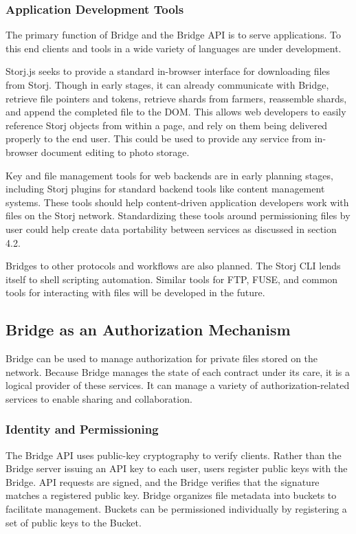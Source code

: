 \documentclass[a4paper,10pt]{article}
\begin{document}
\subsubsection{Application Development Tools}
The primary function of Bridge and the Bridge API is to serve applications. To this end clients and tools in a wide variety of languages are under development.

Storj.js seeks to provide a standard in-browser interface for downloading files from Storj. Though in early stages, it can already communicate with Bridge, retrieve file pointers and tokens, retrieve shards from farmers, reassemble shards, and append the completed file to the DOM. This allows web developers to easily reference Storj objects from within a page, and rely on them being delivered properly to the end user. This could be used to provide any service from in-browser document editing to photo storage.

Key and file management tools for web backends are in early planning stages, including Storj plugins for standard backend tools like content management systems. These tools should help content-driven application developers work with files on the Storj network. Standardizing these tools around permissioning files by user could help create data portability between services as discussed in section 4.2.

Bridges to other protocols and workflows are also planned. The Storj CLI lends itself to shell scripting automation. Similar tools for FTP, FUSE, and common tools for interacting with files will be developed in the future.

\subsection{Bridge as an Authorization Mechanism}
Bridge can be used to manage authorization for private files stored on the network. Because Bridge manages the state of each contract under its care, it is a logical provider of these services. It can manage a variety of authorization-related services to enable sharing and collaboration.

\subsubsection{Identity and Permissioning}
The Bridge API uses public-key cryptography to verify clients. Rather than the Bridge server issuing an API key to each user, users register public keys with the Bridge. API requests are signed, and the Bridge verifies that the signature matches a registered public key. Bridge organizes file metadata into buckets to facilitate management. Buckets can be permissioned individually by registering a set of public keys to the Bucket.
\end{document}
